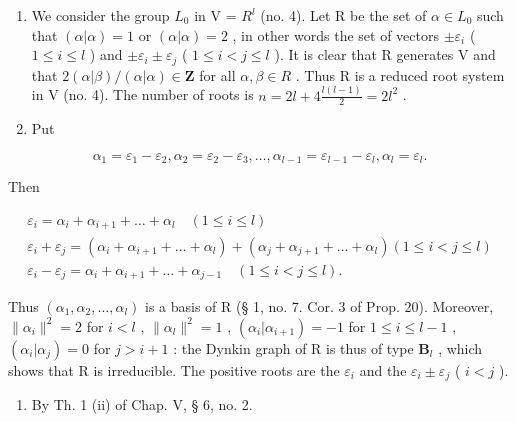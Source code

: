 \begin{enumerate}
\def\labelenumi{(\Roman{enumi})}
\item
  We consider the group \(L_{0}\) in V = \(R^{l}\) (no. 4). Let R be the set of \(\alpha \in L_{0}\) such that \((\alpha|\alpha) = 1\) or \((\alpha|\alpha) = 2\) , in other words the set of vectors \(\pm\varepsilon_{i}\) ( \(1 \leqslant i \leqslant l\) ) and \(\pm\varepsilon_{i} \pm \varepsilon_{j}\) ( \(1 \leqslant i < j \leqslant l\) ). It is clear that R generates V and that \(2(\alpha|\beta)/(\alpha|\alpha) \in \mathbf{Z}\) for all \(\alpha, \beta \in R\) . Thus R is a reduced root system in V (no. 4). The number of roots is \(n = 2l + 4\frac{l(l-1)}{2} = 2l^{2}\) .
\item
  Put
\end{enumerate}

\[
\alpha_ {1} = \varepsilon_ {1} - \varepsilon_ {2}, \alpha_ {2} = \varepsilon_ {2} - \varepsilon_ {3}, \dots , \alpha_ {l - 1} = \varepsilon_ {l - 1} - \varepsilon_ {l}, \alpha_ {l} = \varepsilon_ {l}.
\]

Then

\[
\begin{array}{c} \varepsilon_ {i} = \alpha_ {i} + \alpha_ {i + 1} + \dots + \alpha_ {l} \quad (1 \leqslant i \leqslant l) \\ \varepsilon_ {i} + \varepsilon_ {j} = (\alpha_ {i} + \alpha_ {i + 1} + \dots + \alpha_ {l}) + (\alpha_ {j} + \alpha_ {j + 1} + \dots + \alpha_ {l}) (1 \leqslant i <   j \leqslant l) \\ \varepsilon_ {i} - \varepsilon_ {j} = \alpha_ {i} + \alpha_ {i + 1} + \dots + \alpha_ {j - 1} \quad (1 \leqslant i <   j \leqslant l). \end{array}
\]

Thus \((\alpha_{1},\alpha_{2},\ldots ,\alpha_{l})\) is a basis of R (§ 1, no. 7. Cor. 3 of Prop. 20). Moreover, \(\| \alpha_{i}\|^{2} = 2\) for \(i < l\) , \(\| \alpha_l\| ^2 = 1\) , \((\alpha_i|\alpha_{i + 1}) = -1\) for \(1\leqslant i\leqslant l - 1\) , \((\alpha_i|\alpha_j) = 0\) for \(j > i + 1\) : the Dynkin graph of R is thus of type \(\mathbf{B}_l\) , which shows that R is irreducible. The positive roots are the \(\varepsilon_{i}\) and the \(\varepsilon_{i}\pm \varepsilon_{j}\) ( \(i < j\) ).

\begin{enumerate}
\def\labelenumi{(\Roman{enumi})}
\setcounter{enumi}{2}
\tightlist
\item
  By Th. 1 (ii) of Chap. V, § 6, no. 2.
\end{enumerate}

